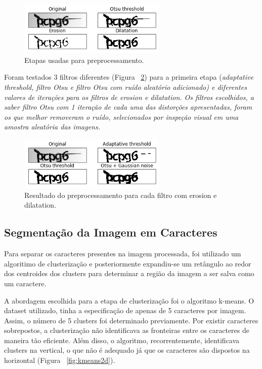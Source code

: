 \documentclass[11pt]{article}
\begin{document}
  \begin{figure}[H]
        {\centering
        \includegraphics[width=70mm]{images/preproc.png}
        \caption{Etapas usadas para preprocessamento.}
        \label{fig:preproc}\par}
  \end{figure}

Foram testados 3 filtros diferentes (Figura ~\ref{fig:filters}) para a primeira etapa (\em adaptative threshold\em , filtro Otsu e filtro Otsu com ruído aleatório adicionado) e diferentes valores de iterações para os filtros de \em erosion \em e \em dilatation\em . Os filtros escolhidos, a saber filtro Otsu com 1 iteração de cada uma das distorções apresentadas, foram os que melhor removeram o ruído, selecionados por inspeção visual em uma amostra aleatória das imagens.

  \begin{figure}[H]
        {\centering
        \includegraphics[width=70mm]{images/filters.png}
        \caption{Resultado do preprocessamento para cada filtro com erosion e dilatation.}
        \label{fig:filters}\par}
  \end{figure}


\subsection{Segmentação da Imagem em Caracteres}
\label{sec:cluteri}

Para separar os caracteres presentes na imagem processada, foi utilizado um algoritimo de clusterização e posteriormente expandiu-se um retângulo ao redor dos centroides dos clusters para determinar a região da imagem a ser salva como um caractere.

A abordagem escolhida para a etapa de clusterização foi o algoritmo k-means. O dataset utilizado, tinha a especificação de apenas de 5 caracteres por imagem. Assim, o número de 5 clusters foi determinado previamente. Por existir caracteres sobrepostos, a clusterização não identificava as fronteiras entre os caracteres de maneira tão eficiente. Além disso, o algoritmo, recorrentemente, identificava clusters na vertical, o que não é adequado já que os caracteres são dispostos na horizontal (Figura ~\ref{fig:kmeans2d}). 
\end{document}
